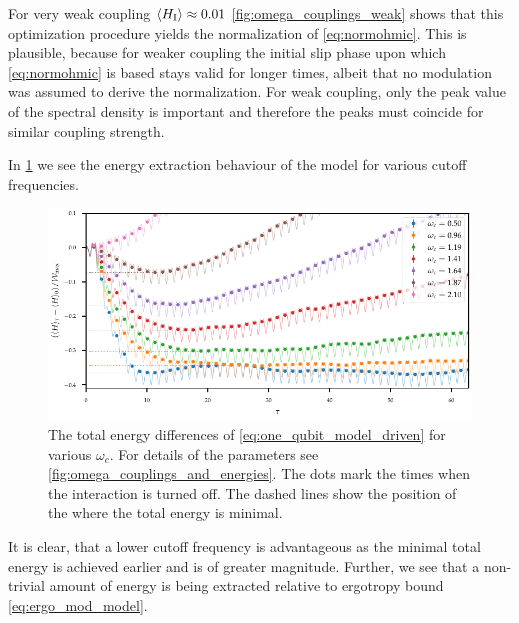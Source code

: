 For very weak coupling \(\ev{H_{\inter}}\approx 0.01\)
\cref{fig:omega_couplings_weak} shows that this optimization procedure
yields the normalization of \cref{eq:normohmic}. This is plausible,
because for weaker coupling the initial slip phase upon which
\cref{eq:normohmic} is based stays valid for longer times, albeit that no
modulation was assumed to derive the normalization. For weak coupling,
only the peak value of the spectral density is important and therefore
the peaks must coincide for similar coupling strength.

In \cref{fig:omegas_total} we see the energy extraction behaviour of
the model for various cutoff frequencies.
\begin{figure}[h]
  \centering
  \includegraphics{figs/one_bath_mod/omegas_total}
  \caption{\label{fig:omegas_total} The total energy differences of
    \cref{eq:one_qubit_model_driven} for various \(ω_{c}\). For
    details of the parameters see
    \cref{fig:omega_couplings_and_energies}. The dots mark the times
    when the interaction is turned off.  The dashed lines show the
    position of the where the total energy is minimal.}
\end{figure}
It is clear, that a lower cutoff frequency is advantageous as the
minimal total energy is achieved earlier and is of greater
magnitude. Further, we see that a non-trivial amount of energy is
being extracted relative to ergotropy bound \cref{eq:ergo_mod_model}.

